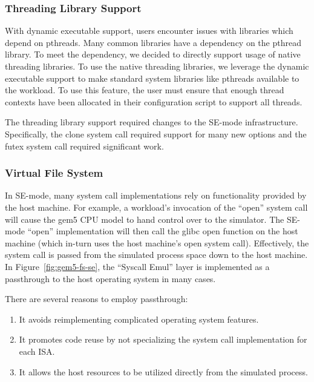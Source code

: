 \subsubsection{Threading Library Support}

With dynamic executable support, users encounter issues with libraries which depend on pthreads.
Many common libraries have a dependency on the pthread library.
To meet the dependency, we decided to directly support usage of native threading libraries.
To use the native threading libraries, we leverage the dynamic executable support to make standard system libraries like pthreads available to the workload.
To use this feature, the user must ensure that enough thread contexts have been allocated in their configuration script to support all threads.


The threading library support required changes to the SE-mode infrastructure.
Specifically, the clone system call required support for many new options and the futex system call required significant work.

\subsubsection{Virtual File System}
\label{sec:vfs}

In SE-mode, many system call implementations rely on functionality provided by the host machine.
For example, a workload's invocation of the ``open'' system call will cause the gem5 CPU model to hand control over to the simulator.
The SE-mode ``open'' implementation will then call the glibc open function on the host machine (which in-turn uses the host machine's open system call).
Effectively, the system call is passed from the simulated process space down to the host machine.
In Figure~\ref{fig:gem5-fs-se}, the ``Syscall Emul'' layer is implemented as a passthrough to the host operating system in many cases.

There are several reasons to employ passthrough:
\begin{enumerate}
    \item It avoids reimplementing complicated operating system features.
    \item It promotes code reuse by not specializing the system call implementation for each ISA.
    \item It allows the host resources to be utilized directly from the simulated process.
\end{enumerate}

